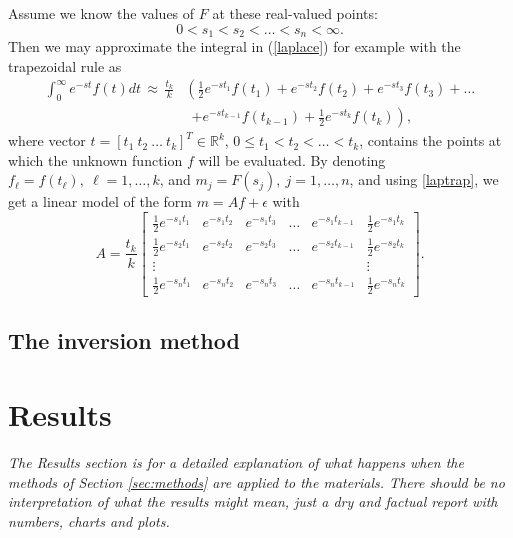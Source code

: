 \documentclass[12pt,a4]{article}
\newcommand{\R}{{\mathbb R}}
\begin{document}
Assume we know the values of $F$ at these real-valued points:
$$
 0<s_1<s_2<\ldots <s_n<\infty.
$$ 
Then we may approximate the integral in (\ref{laplace}) for example with the trapezoidal rule as
\begin{equation} \label{laptrap}
\begin{split}
 \int_0^\infty e^{-st}f(t)dt\, \approx\, \frac{t_k}{k} & \left( \frac{1}{2}e^{-st_1}f(t_1)+e^{-st_2}f(t_2)+e^{-st_3}f(t_3)+\ldots\right.\\   &\ \ \left. +e^{-st_{k-1}}f(t_{k-1})+\frac{1}{2}e^{-st_k}f(t_k)\right) ,
\end{split}
\end{equation}
where vector $t=[t_1\ t_2\ \ldots\ t_k]^T\in\R^k$, $0\leq t_1<t_2<\ldots <t_k$, contains the points at which the unknown function $f$ will be evaluated. By denoting $f_\ell=f(t_\ell), \ \ell=1,\ldots ,k$, and $m_j=F(s_j),\ j=1,\ldots ,n$, and using \eqref{laptrap}, we get a linear model of the form $m=Af+\epsilon$ with
\begin{equation}\label{LaplaceA} 
A = \frac{t_k}{k}\begin{bmatrix} \frac{1}{2}e^{-s_1t_1} & e^{-s_1t_2} & e^{-s_1t_3} & \ldots & e^{-s_1t_{k-1}} & \frac{1}{2}e^{-s_1t_k} \\
                       \frac{1}{2}e^{-s_2t_1} & e^{-s_2t_2} & e^{-s_2t_3} & \ldots & e^{-s_2t_{k-1}} & \frac{1}{2}e^{-s_2t_k} \\
                       \vdots & & & & & \vdots \\
                       \frac{1}{2}e^{-s_nt_1} & e^{-s_nt_2} & e^{-s_nt_3} & \ldots & e^{-s_nt_{k-1}} & \frac{1}{2}e^{-s_nt_k} \end{bmatrix}.
\end{equation}


\subsection{The inversion method}


\section{Results}\label{sec:results}

{\em The Results section is for a detailed explanation of what happens when the methods of Section \ref{sec:methods} are applied to the materials. There should be no interpretation of what the results might mean, just a dry and factual report with numbers, charts and plots.}
\end{document}
